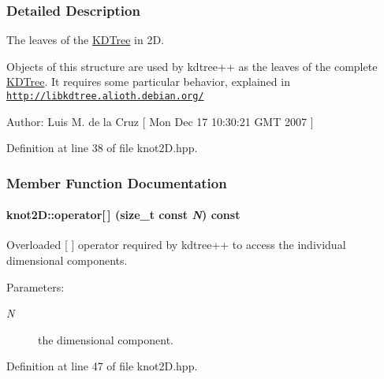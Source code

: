 \subsubsection{Detailed Description}
The leaves of the \hyperlink{namespaceKDTree}{KDTree} in 2D. 

Objects of this structure are used by kdtree++ as the leaves of the complete \hyperlink{namespaceKDTree}{KDTree}. It requires some particular behavior, explained in \href{http://libkdtree.alioth.debian.org/}{\tt http://libkdtree.alioth.debian.org/} \begin{Desc}
\item[Author:]Luis M. de la Cruz \mbox{[} Mon Dec 17 10:30:21 GMT 2007 \mbox{]} \end{Desc}


Definition at line 38 of file knot2D.hpp.

\subsubsection{Member Function Documentation}
\hypertarget{structknot2D_04b5b4239c2c808b41205b4159e786fa}{
\paragraph[{operator[]}]{ knot2D::operator\mbox{[}$\,$\mbox{]} (size\_\-t const  {\em N}) const}\hfill}
\label{structknot2D_04b5b4239c2c808b41205b4159e786fa}


Overloaded \mbox{[} \mbox{]} operator required by kdtree++ to access the individual dimensional components. 

\begin{Desc}
\item[Parameters:]
\begin{description}
\item[{\em N}]the dimensional component. \end{description}
\end{Desc}


Definition at line 47 of file knot2D.hpp.